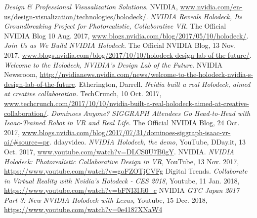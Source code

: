 \documentclass[11pt]{article}
\begin{document}
\newpage
\begin{thebibliography}{10}
\textit{Design \& Professional Visusalization Solutions}. NVIDIA, \url{www.nvidia.com/en-us/design-visualization/technologies/holodeck/}.
\textit{NVIDIA Reveals Holodeck, Its Groundbreaking Project for Photorealistic, Collaborative VR.} 
The Official NVIDIA Blog 10 Aug. 2017, \url{www.blogs.nvidia.com/blog/2017/05/10/holodeck/}.
\textit{Join Us as We Build NVIDIA Holodeck.} The Official NVIDIA Blog, 13 Nov. 2017, \url{www.blogs.nvidia.com/blog/2017/10/10/holodeck-design-lab-of-the-future/}.
\textit{Welcome to the Holodeck, NVIDIA's Design Lab of the Future}. NVIDIA Newsroom, \url{http://nvidianews.nvidia.com/news/welcome-to-the-holodeck-nvidia-s-design-lab-of-the-future}.
Etherington, Darrell. \textit{Nvidia built a real Holodeck, aimed at creative collaboration.} TechCrunch, 10 Oct. 2017, \url{www.techcrunch.com/2017/10/10/nvidia-built-a-real-holodeck-aimed-at-creative-collaboration/}.
\textit{Dominoes Anyone? SIGGRAPH Attendees Go Head-to-Head with Isaac-Trained Robot in VR and Real Life.} The Official NVIDIA Blog, 24 Oct. 2017, \url{www.blogs.nvidia.com/blog/2017/07/31/dominoes-siggraph-isaac-vr-ai/#source=pr}.
ddayvideo. \textit{NVIDIA Holodeck, the demo}, YouTube, DDay.it, 13 Oct. 2017, \url{www.youtube.com/watch?v=DLCS0U7B0gY}.
NVIDIA. \textit{NVIDIA Holodeck: Photorealistic Collaborative Design in VR}, YouTube, 13 Nov. 2017, \url{https://www.youtube.com/watch?v=goFZOTjCVFg}
Digital Trends. \textit{Collaborate in Virtual Reality with Nvidia's Holodeck - CES 2018}, Youtube, 11 Jan. 2018, \url{https://www.youtube.com/watch?v=bFNI3IJi0_c}
NVIDIA \textit{GTC Japan 2017 Part 3: New NVIDIA Holodeck with Lexus}, Youtube, 15 Dec. 2018, \url{https://www.youtube.com/watch?v=0e4187XNaW4}

\end{thebibliography}
\end{document}
